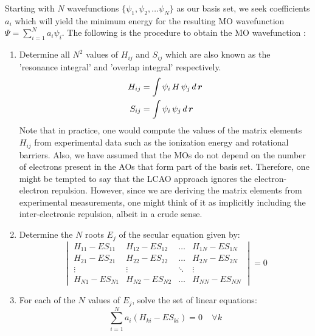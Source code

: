             Starting with $N$ wavefunctions $\{\psi_1, \psi_2, \ldots \psi_N\}$ as our basis set, we seek coefficients $a_{i}$ which will yield the minimum energy for the resulting MO wavefunction $\Psi = \displaystyle\sum_{i=1}^N a_{i} \psi_i$. The following is the procedure to obtain the MO wavefunction :
            \begin{enumerate}
                \item Determine all $N^2$ values of $H_{ij}$ and $S_{ij}$ which are also known as the 'resonance integral' and 'overlap integral' respectively.
                    \begin{equation}\label{eq:resonance and overlap}
                        \begin{aligned}
                            H_{ij} &= \displaystyle\int \psi_i\, H \,\psi_j\, d\,{\boldsymbol {r}}\\
                            S_{ij} &= \displaystyle\int \psi_i\, \psi_j\, d\,{\boldsymbol {r}}
                        \end{aligned}
                    \end{equation}
                    Note that in practice, one would compute the values of the matrix elements $H_{ij}$ from experimental data such as the ionization energy and rotational barriers. Also, we have assumed that the MOs do not depend on the number of electrons present in the AOs that form part of the basis set. Therefore, one might be tempted to say that the LCAO approach ignores the electron-electron repulsion. However, since we are deriving the matrix elements from experimental measurements, one might think of it as implicitly including the inter-electronic repulsion, albeit in a crude sense.
                \item Determine the $N$ roots $E_j$ of the secular equation given by:
                    \begin{equation}\label{eq:secular}
                        \begin{vmatrix}
                            H_{11} - E S_{11} & H_{12} - E S_{12} & \ldots & H_{1N} - E S_{1N}\\
                            H_{21} - E S_{21} & H_{22} - E S_{22} & \ldots & H_{2N} - E S_{2N}\\
                            \vdots & \vdots & \ddots & \vdots\\
                            H_{N1} - E S_{N1} & H_{N2} - E S_{N2} & \ldots & H_{NN} - E S_{NN}
                        \end{vmatrix}
                        = 0
                    \end{equation}
                \item For each of the $N$ values of $E_j$, solve the set of linear equations:
                    \begin{equation}\label{eq:linear}
                        \displaystyle\sum_{i=1}^N a_i (H_{ki} - E S_{ki}) = 0 \:\:\:\:\: \forall k
                    \end{equation}
            \end{enumerate}
